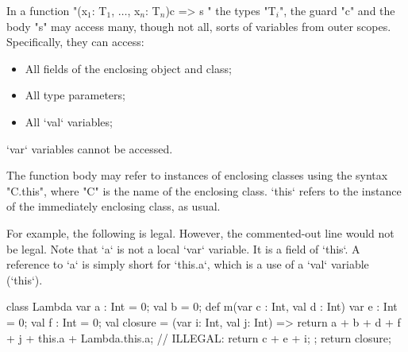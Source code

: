 In a function
\xcdmath"(x$_1$: T$_1$, $\dots$, x$_n$: T$_n$){c} => { s }"
the types \xcdmath"T$_i$", the guard \xcd"c" and the body \xcd"s"
may access many, though not all, sorts of variables from outer scopes.  
Specifically, they can access: 
\begin{itemize}
\item All fields of the enclosing object and class;
\item All type parameters;
\item All \xcd`val` variables;
\end{itemize}
\noindent
\xcd`var` variables cannot be accessed.


The function body may refer to instances of enclosing classes using
the syntax \xcd"C.this", where \xcd"C" is the name of the
enclosing class.  \xcd`this` refers to the instance of the immediately
enclosing class, as usual.

For example, the following is legal.  
However, the commented-out line would not be legal.
Note that \xcd`a` is not a local \xcd`var` variable. It is a field of
\xcd`this`. A reference to \xcd`a` is simply short for \xcd`this.a`, which is
a use of a \xcd`val` variable (\xcd`this`).  
\begin{xten}
class Lambda {
   var a : Int = 0;
   val b = 0;
   def m(var c : Int, val d : Int) {
      var e : Int = 0;
      val f : Int = 0;
      val closure = (var i: Int, val j: Int) => {
    	  return a + b + d + f + j + this.a + Lambda.this.a;
          // ILLEGAL: return c + e + i;
      };
      return closure;
   }
}
\end{xten}
%




